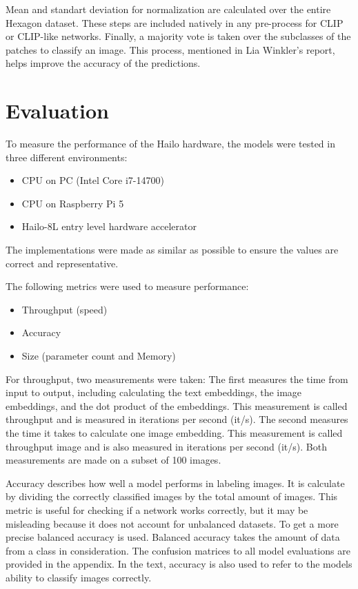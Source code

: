 Mean and standart deviation for normalization are calculated over the entire Hexagon dataset.
These steps are included natively in any pre-process for CLIP or CLIP-like networks.
Finally, a majority vote is taken over the subclasses of the patches to classify an image. 
This process, mentioned in Lia Winkler's report, helps improve the accuracy of the predictions.

\section{Evaluation}

To measure the performance of the Hailo hardware, the models were tested in three different environments:
\begin{itemize}
    \item CPU on PC (Intel Core i7-14700)
    \item CPU on Raspberry Pi 5
    \item Hailo-8L entry level hardware accelerator
\end{itemize}
The implementations were made as similar as possible to ensure the values are correct and representative. 

The following metrics were used to measure performance:
\begin{itemize}
    \item Throughput (speed)
    \item Accuracy
    \item Size (parameter count and Memory)
\end{itemize}

For throughput, two measurements were taken:
The first measures the time from input to output, including calculating the text embeddings, the image embeddings, and the dot product of the embeddings. This measurement is called throughput and is measured in iterations per second (it/s).
The second measures the time it takes to calculate one image embedding. This measurement is called throughput image and is also measured in iterations per second (it/s).
Both measurements are made on a subset of 100 images.

Accuracy describes how well a model performs in labeling images.
It is calculate by dividing the correctly classified images by the total amount of images.
This metric is useful for checking if a network works correctly, but it may be misleading because it does not account for unbalanced datasets.
To get a more precise balanced accuracy is used.
Balanced accuracy takes the amount of data from a class in consideration.
The confusion matrices to all model evaluations are provided in the appendix.
In the text, accuracy is also used to refer to the models ability to classify images correctly.

